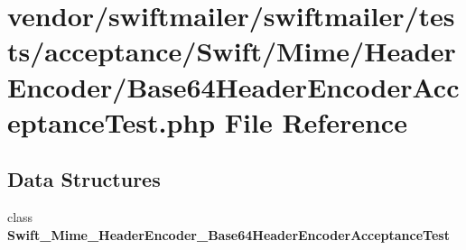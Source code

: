 \section{vendor/swiftmailer/swiftmailer/tests/acceptance/\+Swift/\+Mime/\+Header\+Encoder/\+Base64\+Header\+Encoder\+Acceptance\+Test.php File Reference}
\label{_base64_header_encoder_acceptance_test_8php}
\subsection*{Data Structures}
\begin{DoxyCompactItemize}
\item 
class {\bf Swift\+\_\+\+Mime\+\_\+\+Header\+Encoder\+\_\+\+Base64\+Header\+Encoder\+Acceptance\+Test}
\end{DoxyCompactItemize}
